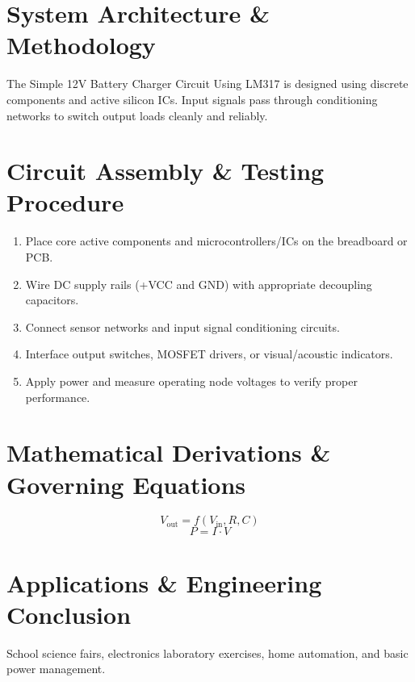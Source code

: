 \documentclass[11pt,a4paper]{article}
\begin{document}
\section{System Architecture \& Methodology}
The Simple 12V Battery Charger Circuit Using LM317 is designed using discrete components and active silicon ICs. Input signals pass through conditioning networks to switch output loads cleanly and reliably.

\section{Circuit Assembly \& Testing Procedure}
\begin{enumerate}
    \item Place core active components and microcontrollers/ICs on the breadboard or PCB.
    \item Wire DC supply rails (+VCC and GND) with appropriate decoupling capacitors.
    \item Connect sensor networks and input signal conditioning circuits.
    \item Interface output switches, MOSFET drivers, or visual/acoustic indicators.
    \item Apply power and measure operating node voltages to verify proper performance.
\end{enumerate}

\section{Mathematical Derivations \& Governing Equations}
\begin{equation}
V_{\text{out}} = f(V_{\text{in}}, R, C)
\end{equation}
\begin{equation}
P = I \cdot V
\end{equation}

\section{Applications \& Engineering Conclusion}
School science fairs, electronics laboratory exercises, home automation, and basic power management.
\end{document}
